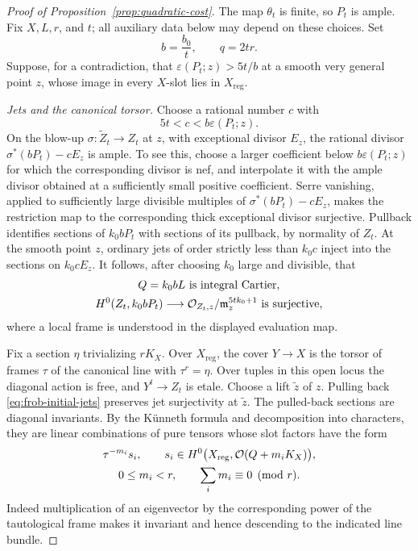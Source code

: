 \begin{proof}[Proof of Proposition~\ref{prop:quadratic-cost}]
The map $\theta_t$ is finite, so $P_t$ is ample.  Fix $X,L,r$, and $t$;
all auxiliary data below may depend on these choices.  Set
\begin{equation}\label{eq:frob-bq}
 b=\frac{b_0}{t},\qquad q=2tr.
\end{equation}
Suppose, for a contradiction, that
$\varepsilon(P_t;z)>5t/b$ at a smooth very general point $z$, whose image
in every $X$-slot lies in $X_{\mathrm{reg}}$.

\emph{Jets and the canonical torsor.}
Choose a rational number $c$ with
\[
 5t<c<b\varepsilon(P_t;z).
\]
On the blow-up $\sigma:\widetilde Z_t\to Z_t$ at $z$, with exceptional
divisor $E_z$, the rational divisor $\sigma^*(bP_t)-cE_z$ is ample.  To
see this, choose a larger coefficient below
$b\varepsilon(P_t;z)$ for which the corresponding divisor is nef, and
interpolate it with the ample divisor obtained at a sufficiently small
positive coefficient.  Serre vanishing, applied to sufficiently large
divisible multiples of $\sigma^*(bP_t)-cE_z$, makes the restriction map
to the corresponding thick exceptional divisor surjective.  Pullback
identifies sections of $k_0bP_t$ with sections of its pullback, by
normality of $Z_t$.  At the smooth point $z$, ordinary jets of order
strictly less than $k_0c$ inject into the sections on $k_0cE_z$.
It follows, after choosing $k_0$ large and divisible, that
\begin{equation}\label{eq:frob-initial-jets}
 \begin{gathered}
 Q=k_0bL\text{ is integral Cartier},\\
 H^0(Z_t,k_0bP_t)\longrightarrow
 \mathcal O_{Z_t,z}/\mathfrak m_z^{5tk_0+1}
 \text{ is surjective},
 \end{gathered}
\end{equation}
where a local frame is understood in the displayed evaluation map.

Fix a section $\eta$ trivializing $rK_X$.  Over $X_{\mathrm{reg}}$,
the cover $Y\to X$ is the torsor of frames $\tau$ of the canonical line
with $\tau^r=\eta$.  Over tuples in this open locus the diagonal action
is free, and $Y^t\to Z_t$ is etale.  Choose a lift $\widetilde z$ of $z$.
Pulling back \eqref{eq:frob-initial-jets} preserves jet surjectivity at
$\widetilde z$.  The pulled-back sections are diagonal invariants.
By the K\"unneth formula and decomposition into characters, they are
linear combinations of pure tensors whose slot factors have the form
\begin{equation}\label{eq:frob-eigen-tensors}
 \begin{gathered}
 \tau^{-m_i}s_i,
 \qquad
 s_i\in H^0\bigl(X_{\mathrm{reg}},\mathcal O(Q+m_iK_X)\bigr),
 \\
 0\le m_i<r,
 \qquad
 \sum_i m_i\equiv0\pmod r.
 \end{gathered}
\end{equation}
Indeed multiplication of an eigenvector by the corresponding power of
the tautological frame makes it invariant and hence descending to the
indicated line bundle.


\end{proof}
